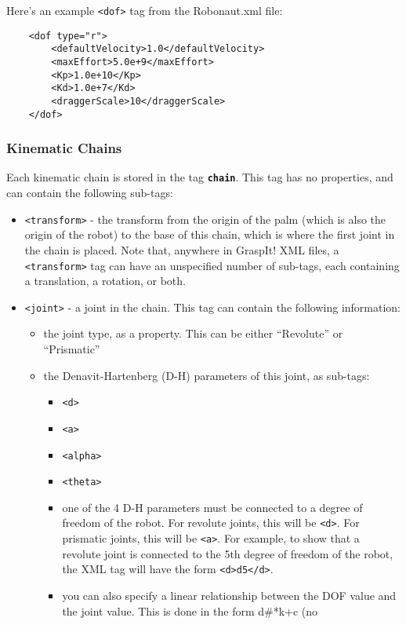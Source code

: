 Here's an example \texttt{<dof>} tag from the Robonaut.xml file:
\begin{verbatim}
    <dof type="r">
        <defaultVelocity>1.0</defaultVelocity>
        <maxEffort>5.0e+9</maxEffort>
        <Kp>1.0e+10</Kp>
        <Kd>1.0e+7</Kd>
        <draggerScale>10</draggerScale>
    </dof>
\end{verbatim}

\subsubsection{Kinematic Chains}

Each kinematic chain is stored in the tag
\texttt{\textbf{chain}}. This tag has no properties, and can contain
the following sub-tags:
\begin{itemize}
\item \texttt{<transform>} - the transform from the origin of the palm (which
  is also the origin of the robot) to the base of this chain, which is
  where the first joint in the chain is placed. Note that, anywhere in
  GraspIt! XML files, a \texttt{<transform>} tag can have an unspecified number
  of sub-tags, each containing a translation, a rotation, or both.
\item \texttt{<joint>} - a joint in the chain. This tag can contain the
  following information:
  \begin{itemize}
    \item the joint type, as a property. This can be either
      ``Revolute'' or ``Prismatic''
    \item the Denavit-Hartenberg (D-H) parameters of this joint, as
      sub-tags:
    \begin{itemize}
      \item \texttt{\texttt{<d>}}
      \item \texttt{<a>}
      \item \texttt{<alpha>}
      \item \texttt{<theta>}
      \item one of the 4 D-H parameters must be connected to a degree
        of freedom of the robot. For revolute joints, this will be
        \texttt{<d>}. For prismatic joints, this will be \texttt{<a>}. For example, to
        show that a revolute joint is connected to the 5th degree of
        freedom of the robot, the XML tag will have the form
        \texttt{\texttt{<d>}d5\texttt{</d>}}.
      \item you can also specify a linear relationship between the DOF
        value and the joint value. This is done in the form d\#*k+c (no

\end{itemize}
\end{itemize}
\end{itemize}
